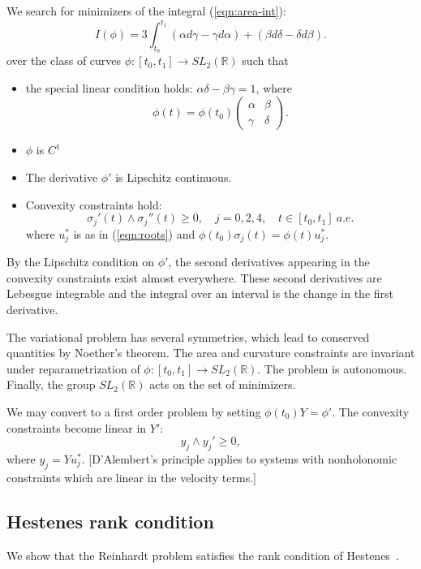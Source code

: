 \documentclass[11pt]{amsart}
\newcommand{\ring}[1]{\mathbb{#1}}
\begin{document}
We search for minimizers of the integral (\ref{eqn:area-int}):
\begin{equation}
I(\phi) = 3\int_{t_0}^{t_1} (\alpha d\gamma - \gamma d\alpha) + (\beta d\delta - \delta d\beta).
\end{equation}
over the class of curves $\phi:[t_0,t_1]\to SL_2(\ring{R})$ such that 
\begin{itemize}
\item the special linear condition holds: $\alpha\delta-\beta\gamma=1$, where
 $$\phi(t) = \phi(t_0)\left(\begin{matrix}\alpha&\beta\\\gamma&\delta\end{matrix}\right).$$
\item $\phi$ is $C^1$
\item The derivative $\phi'$ is Lipschitz continuous.
\item Convexity constraints hold:
  $$\sigma_j'(t) \land \sigma_j''(t) \ge 0,\quad j=0,2,4,\quad t\in[t_0,t_1]~a.e.$$
where $u^*_j$ is as in (\ref{eqn:roots}) and $\phi(t_0)\sigma_j(t) = \phi(t) u^*_j$.
\end{itemize}
By the Lipschitz condition on $\phi'$, the second derivatives appearing in the convexity constraints exist almost everywhere.  These second derivatives are Lebesgue integrable and the integral over an interval is the change in the first derivative.



The variational problem has several symmetries, which lead to conserved quantities by Noether's theorem.  The area and curvature constraints are invariant under reparametrization of $\phi:[t_0,t_1]\to SL_2(\ring{R})$.  The problem is autonomous.  Finally, the group $SL_2(\ring{R})$ acts on the set of minimizers.

We may convert to a first order problem by setting $\phi(t_0)Y = \phi'$.  The convexity
constraints become linear in $Y'$:
\begin{equation}\label{eqn:curvature}
  y_j \land y_j' \ge 0,
\end{equation}
where $y_j = Y u^*_j$.
[D'Alembert's principle applies to systems with nonholonomic constraints which are linear in the velocity terms.]

\subsection{Hestenes rank condition}

We show that the Reinhardt problem satisfies the rank condition of Hestenes~\cite[7.11]{He}.
\end{document}
